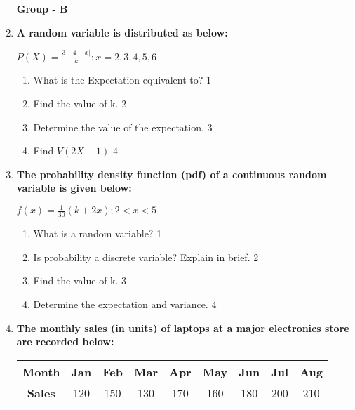\documentclass[12pt]{article}
\begin{document}
\begin{enumerate}
  
  \begin{center}
\textbf{Group  - B}
\end{center}

          \item \textbf{A random variable is distributed as below:}
        
        \begin{center}
  \textbf{$P(X) = \frac{3-\vert 4-x\vert}{k}; x=2,3,4,5,6$}
  \end{center}

  \begin{enumerate}
    \item
	What is the Expectation equivalent to? \hfill 1
    \item
    	Find the value of k. \hfill 2
    \item
    	Determine the value of the expectation. \hfill 3
     \item
     	Find $V(2X-1)$ \hfill 4
  \end{enumerate}

       \item \textbf{The probability density function (pdf) of a continuous random variable is given below:}
	  
	  \begin{center}
	  $\displaystyle f(x) = \frac{1}{30} (k+2x); 2 < x < 5$
	  \end{center}
  
  \begin{enumerate}
    \item
    What is a random variable? \hfill 1
    \item
		Is probability a discrete variable? Explain in brief. \hfill 2
    \item  
	Find the value of k.  \hfill 3
    \item
	Determine the expectation and variance. \hfill 4
  \end{enumerate}

  \item
\textbf{The monthly sales (in units) of laptops at a major electronics store are recorded below:} 

\begin{table}[H]
\centering
\begin{tabular}{c|cccccccc}
\textbf{Month} & Jan & Feb & Mar & Apr & May & Jun & Jul & Aug \\ \hline
\textbf{Sales} & 120 & 150 & 130 & 170 & 160 & 180 & 200 & 210
\end{tabular}
\end{table}


\end{enumerate}
\end{document}
